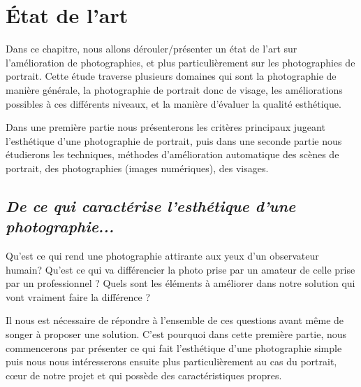 \documentclass[11pt, french]{report-rd-info}
\begin{document}

\chapter{\'Etat de l'art}
\label{chap:EtatArt}



Dans ce chapitre, nous allons dérouler/présenter un état de l’art sur l’amélioration de photographies, et plus particulièrement sur les photographies de portrait. Cette étude traverse plusieurs domaines qui sont la photographie de manière générale, la photographie de portrait donc de visage, les améliorations possibles à ces différents niveaux, et la manière d’évaluer la qualité esthétique.



Dans une première partie nous présenterons les critères principaux jugeant l’esthétique d’une photographie de portrait, puis dans une seconde partie nous étudierons les techniques, méthodes d’amélioration automatique des scènes de portrait, des photographies (images numériques), des visages.



\section{\emph{De ce qui caractérise l’esthétique d’une photographie...}}


Qu’est ce qui rend une photographie attirante aux yeux d’un observateur humain? Qu’est ce qui va différencier la photo prise par un amateur de celle prise par un professionnel ? Quels sont les éléments à améliorer dans notre solution qui vont vraiment faire la différence ? 


Il nous est nécessaire de répondre à l’ensemble de ces questions avant même de songer à proposer une solution. C’est pourquoi dans cette première partie, nous commencerons par présenter ce qui fait l'esthétique d’une photographie simple puis nous nous intéresserons ensuite plus particulièrement au cas du portrait, cœur de notre projet et qui possède des caractéristiques propres.
\end{document}
